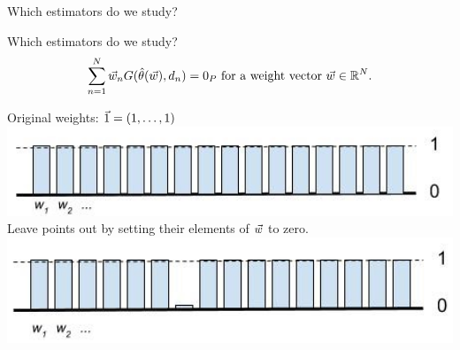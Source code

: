 \begin{frame}[t]{Which estimators do we study?}



\end{frame}




\begin{frame}[t]{Which estimators do we study?}
\vspace{-2em}
\begin{align*}
%
\sumn \w_n
G(\thetahat(\w), \d_{n}) =  \zP
\textrm{ for a weight vector }\w \in \mathbb{R}^N.
%
\end{align*}
%
\begin{minipage}{0.45\textwidth}
\begin{center}
Original weights: $\vec{1} = (1,\ldots,1)$
    \includegraphics[width=1.0\textwidth]{static_figures/orig_weights}
Leave points out by setting their elements of $\vec{w}$ to zero.
    \includegraphics[width=1.0\textwidth]{static_figures/weights_loo}
\end{center}
\end{minipage}
\begin{minipage}{0.45\textwidth}
\begin{center}
\end{center}
\end{minipage}
\end{frame}
